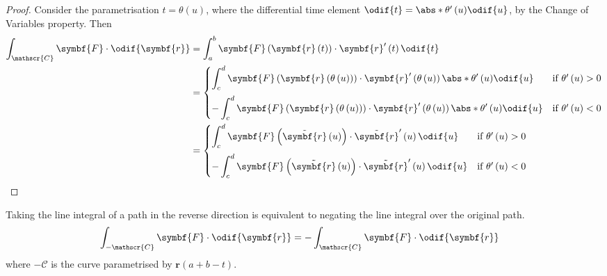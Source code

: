 \documentclass{article}
\begin{document}
\begin{proof}
    Consider the parametrisation \(t = \theta\left( u \right)\),
    where the differential time element
    \(\odif{t} = \abs*{\theta'\left( u \right)} \odif{u}\), by the
    Change of Variables property. Then
    \begin{align*}
        \int_{\mathscr{C}} \symbf{F} \cdot \odif{\symbf{r}} & = \int_a^b \symbf{F}\left( \symbf{r}\left( t \right) \right) \cdot \symbf{r}'\left( t \right) \odif{t} \\
                                                            & =
        \begin{cases}
            \displaystyle\int_c^d \symbf{F}\left( \symbf{r}\left( \theta\left( u \right) \right) \right) \cdot \symbf{r}'\left( \theta\left( u \right) \right) \abs*{\theta'\left( u \right)} \odif{u}  & \text{if } \theta'\left( u \right) > 0 \\[2.5ex]
            -\displaystyle\int_c^d \symbf{F}\left( \symbf{r}\left( \theta\left( u \right) \right) \right) \cdot \symbf{r}'\left( \theta\left( u \right) \right) \abs*{\theta'\left( u \right)} \odif{u} & \text{if } \theta'\left( u \right) < 0
        \end{cases}
        \\
                                                            & =
        \begin{cases}
            \displaystyle\int_c^d \symbf{F}\left( \tilde{\symbf{r}}\left( u \right) \right) \cdot \tilde{\symbf{r}}'\left( u \right) \odif{u}  & \text{if } \theta'\left( u \right) > 0 \\[2.5ex]
            -\displaystyle\int_c^d \symbf{F}\left( \tilde{\symbf{r}}\left( u \right) \right) \cdot \tilde{\symbf{r}}'\left( u \right) \odif{u} & \text{if } \theta'\left( u \right) < 0
        \end{cases}
    \end{align*}
\end{proof}
\begin{corollary}
    Taking the line integral of a path in the reverse direction is
    equivalent to negating the line integral over the original path.
    \begin{align*}
        \int_{-\mathscr{C}} \symbf{F} \cdot \odif{\symbf{r}} & = -\int_{\mathscr{C}} \symbf{F} \cdot \odif{\symbf{r}}
    \end{align*}
    where \(-\mathscr{C}\) is the curve parametrised by
    \(\symbf{r}\left( a + b - t \right)\).
\end{corollary}
\end{document}
